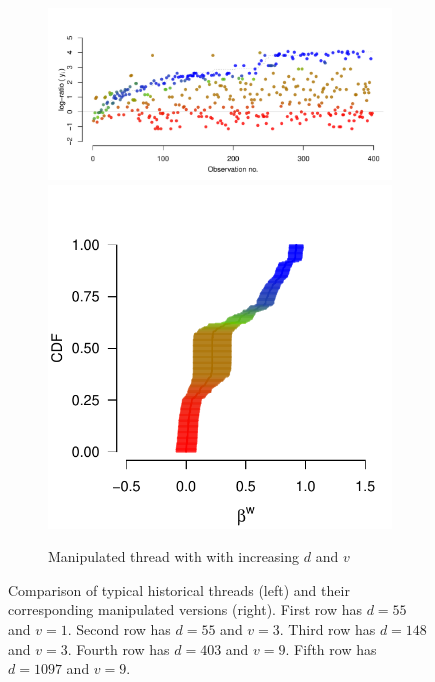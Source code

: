 \documentclass[9pt,a4paper,twocolumn,lineno]{article}
\begin{document}
\begin{figure}
\begin{subfigure}{.44\linewidth}
		\includegraphics[width=.7\linewidth]{thread_max_1097_9.pdf}
		\includegraphics[width=.28\linewidth]{beta_max_1097_9.pdf}
		\caption{\footnotesize Manipulated thread with with increasing $d$ and $v$}
		\label{fig:supp max}
	\end{subfigure}
	\caption{Comparison of typical historical threads (left) and their corresponding manipulated versions (right). First row has $d=55$ and $v=1$. Second row has $d=55$ and $v=3$. Third row has $d=148$ and $v=3$. Fourth row has $d=403$ and $v=9$. Fifth row has $d=1097$ and $v=9$.}
\label{fig:more}
\end{figure}
\end{document}
